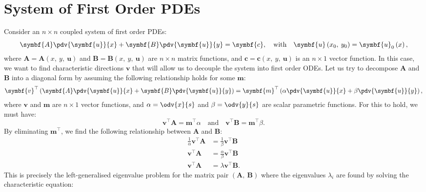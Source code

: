 \documentclass{article}
\theoremstyle{definition}
\begin{document}
\section{System of First Order PDEs}
Consider an \(n \times n\) coupled system of first order PDEs:
\begin{equation*}
    \symbf{A} \pdv{\symbf{u}}{x} + \symbf{B} \pdv{\symbf{u}}{y} = \symbf{c}, \quad \text{with} \quad \symbf{u}\left( x_0,\: y_0 \right) = \symbf{u}_0\left( x \right),
\end{equation*}
where \(\symbf{A} = \symbf{A}\left( x,\: y,\: \symbf{u} \right)\) and
\(\symbf{B} = \symbf{B}\left( x,\: y,\: \symbf{u} \right)\) are
\(n \times n\) matrix functions, and
\(\symbf{c} = \symbf{c}\left( x,\: y,\: \symbf{u} \right)\) is an
\(n \times 1\) vector function.
In this case, we want to find characteristic directions \(\symbf{v}\)
that will allow us to decouple the system into first order ODEs. Let us
try to decompose \(\symbf{A}\) and \(\symbf{B}\) into a diagonal form by
assuming the following relationship holds for some \(\symbf{m}\):
\begin{equation*}
    \symbf{v}^\top \left( \symbf{A} \pdv{\symbf{u}}{x} + \symbf{B} \pdv{\symbf{u}}{y} \right) = \symbf{m}^\top \left( \alpha \pdv{\symbf{u}}{x} + \beta \pdv{\symbf{u}}{y} \right),
\end{equation*}
where \(\symbf{v}\) and \(\symbf{m}\) are \(n \times 1\) vector
functions, and \(\alpha = \odv{x}{s}\) and \(\beta = \odv{y}{s}\) are
scalar parametric functions. For this to hold, we must have:
\begin{equation*}
    \symbf{v}^\top \symbf{A} = \symbf{m}^\top \alpha \quad \text{and} \quad \symbf{v}^\top \symbf{B} = \symbf{m}^\top \beta.
\end{equation*}
By eliminating \(\symbf{m}^\top\), we find the following relationship
between \(\symbf{A}\) and \(\symbf{B}\):
\begin{align*}
    \frac{1}{\alpha} \symbf{v}^\top \symbf{A} & = \frac{1}{\beta} \symbf{v}^\top \symbf{B}      \\
    \symbf{v}^\top \symbf{A}                  & = \frac{\alpha}{\beta} \symbf{v}^\top \symbf{B} \\
    \symbf{v}^\top \symbf{A}                  & = \lambda \symbf{v}^\top \symbf{B}.
\end{align*}
This is precisely the left-generalised eigenvalue problem for the matrix
pair \(\left( \symbf{A},\: \symbf{B} \right)\) where the eigenvalues
\(\lambda_i\) are found by solving the characteristic equation:
\end{document}
